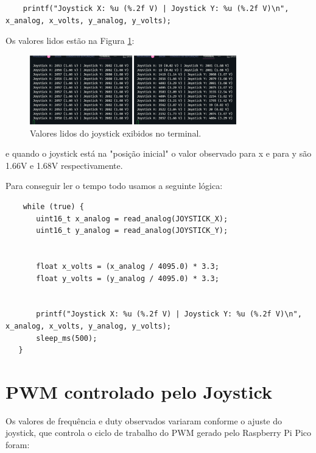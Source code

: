 \documentclass{article}
\begin{document}
\begin{verbatim}
    printf("Joystick X: %u (%.2f V) | Joystick Y: %u (%.2f V)\n", x_analog, x_volts, y_analog, y_volts);
\end{verbatim}
    

Os valores lidos estão na Figura \ref{fig:valores_joystick}:

\begin{figure}[h!]
    \centering
    \includegraphics[width=0.8\textwidth]{fig/valores_loystick.png}
    \caption{Valores lidos do joystick exibidos no terminal.}
    \label{fig:valores_joystick}
\end{figure}

e quando o joystick está na "posição inicial" o valor observado para x e para y são 1.66V e 1.68V respectivamente.

Para conseguir ler o tempo todo usamos a seguinte lógica:


\begin{verbatim}
    while (true) {
       uint16_t x_analog = read_analog(JOYSTICK_X);
       uint16_t y_analog = read_analog(JOYSTICK_Y);


       float x_volts = (x_analog / 4095.0) * 3.3;
       float y_volts = (y_analog / 4095.0) * 3.3;


       printf("Joystick X: %u (%.2f V) | Joystick Y: %u (%.2f V)\n", x_analog, x_volts, y_analog, y_volts);
       sleep_ms(500);
   }
\end{verbatim}


\section{PWM controlado pelo Joystick }

Os valores de frequência e duty observados variaram conforme o ajuste do joystick, que controla o ciclo de trabalho do PWM gerado pelo Raspberry Pi Pico foram:
\end{document}
